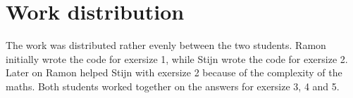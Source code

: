 \documentclass[twoside, a4paper, fleqn, reqno]{article}
\begin{document}
\section*{Work distribution}
The work was distributed rather evenly between the two students.
Ramon initially wrote the code for exersize 1, while Stijn wrote the code for exersize 2.
Later on Ramon helped Stijn with exersize 2 because of the complexity of the maths.
Both students worked together on the answers for exersize 3, 4 and 5.
\end{document}
